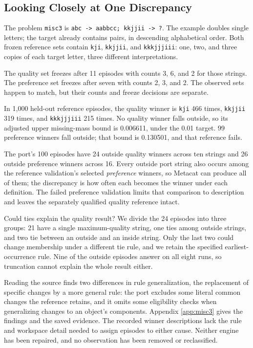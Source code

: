 \documentclass[10pt,letterpaper]{article}
\begin{document}
\subsection{Looking Closely at One Discrepancy}\label{sec:misc3-discrepancy}

The problem \texttt{misc3} is
\texttt{abc\ -\textgreater{}\ aabbcc;\ kkjjii\ -\textgreater{}\ ?}. The example doubles
single letters; the target already contains pairs, in descending alphabetical order. Both
frozen reference sets contain \texttt{kji}, \texttt{kkjjii}, and \texttt{kkkjjjiii}: one,
two, and three copies of each target letter, three different interpretations.

The quality set freezes after 11 episodes with counts 3, 6, and 2 for those strings. The
preference set freezes after seven with counts 2, 3, and 2. The observed sets happen to
match, but their counts and freeze decisions are separate.

In 1,000 held-out reference episodes, the quality winner is \texttt{kji} 466 times,
\texttt{kkjjii} 319 times, and \texttt{kkkjjjiii} 215 times. No quality winner falls
outside, so its adjusted upper missing-mass bound is 0.006611, under the 0.01 target. 99
preference winners fall outside; that bound is 0.130501, and that reference fails.

The port's 100 episodes have 24 outside quality winners across ten strings and 26 outside
preference winners across 16. Every outside port string also occurs among the reference
validation's selected \emph{preference} winners, so Metacat can produce all of them; the
discrepancy is how often each becomes the winner under each definition. The failed
preference validation limits that comparison to description and leaves the separately
qualified quality reference intact.

Could ties explain the quality result? We divide the 24 episodes into three groups: 21
have a single maximum-quality string, one ties among outside strings, and two tie between
an outside and an inside string. Only the last two could change membership under a
different tie rule, and we retain the specified earliest-occurrence rule. Nine of the
outside episodes answer on all eight runs, so truncation cannot explain the whole result
either.

Reading the source finds two differences in rule generalization, the replacement of
specific changes by a more general rule: the port excludes some literal common changes the
reference retains, and it omits some eligibility checks when generalizing changes to an
object's components. Appendix \ref{app:misc3} gives the findings and the saved evidence.
The recorded winner descriptions lack the rule and workspace detail needed to assign
episodes to either cause. Neither engine has been repaired, and no observation has been
removed or reclassified.
\end{document}

